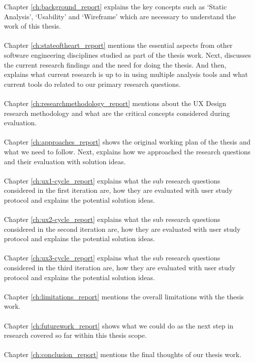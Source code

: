 \noindent Chapter \ref{ch:background_report} explains the key concepts such as ‘Static Analysis’, ‘Usability’ and ‘Wireframe’ which are necessary to understand the work of this thesis. \\ \\
Chapter \ref{ch:stateoftheart_report} mentions the essential aspects from other software engineering disciplines studied as part of the thesis work. Next, discusses the current research findings and the need for doing the thesis. And then, explains what current research is up to in using multiple analysis tools and what current tools do related to our primary research questions. \\ \\
Chapter \ref{ch:researchmethodology_report} mentions about the UX Design research methodology and what are the critical concepts considered during evaluation. \\ \\
Chapter \ref{ch:approaches_report} shows the original working plan of the thesis and what we need to follow. Next, explains how we approached the research questions and their evaluation with solution ideas. \\ \\
Chapter \ref{ch:ux1-cycle_report} explains what the sub research questions considered in the first iteration are, how they are evaluated with user study protocol and explains the potential solution ideas. \\ \\
Chapter \ref{ch:ux2-cycle_report} explains what the sub research questions considered in the second iteration are, how they are evaluated with user study protocol and explains the potential solution ideas. \\ \\
Chapter \ref{ch:ux3-cycle_report} explains what the sub research questions considered in the third iteration are, how they are evaluated with user study protocol and explains the potential solution ideas. \\ \\
Chapter \ref{ch:limitations_report} mentions the overall limitations with the thesis work. \\ \\
Chapter \ref{ch:futurework_report} shows what we could do as the next step in research covered so far within this thesis scope. \\ \\
Chapter \ref{ch:conclusion_report} mentions the final thoughts of our thesis work. \\ \\

\let\cleardoublepage\clearpage
